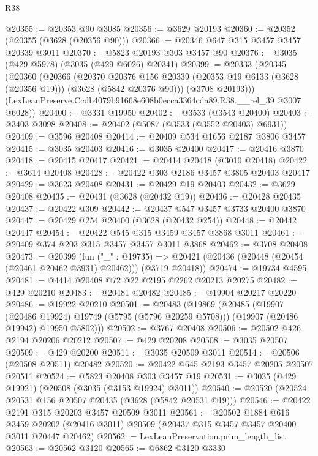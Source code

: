 \begin{lexlean}{R38}
\begin{coremodule}
@20355 := @20353 @90 @3085
@20356 := @3629 @20193
@20360 := @20352 (@20355 (@3628 (@20356 @90)))
@20366 := @20346 @647 @315 @3457 @3457 @20339 @3011
@20370 := @5823 @20193 @303 @3457 @90
@20376 := @3035 (@429 @5978) (@3035 (@429 @6026) @20341)
@20399 := @20333
    (@20345
      (@20360
        (@20366
          (@20370
            @20376
            @156
            @20339
            (@20353 @19 @6133 (@3628 (@20356 @19)))
            (@3628 (@5842 @20376 @90)))
          (@3708 @20193)))
      (LexLeanPreserve.Ccdb4079b91668e608b0ecca3364cda89.R38.__rel_39 @3007 @6028))
@20400 := @3331 @19950
@20402 := @3533 (@3543 @20400)
@20403 := @3403 @3098
@20408 := @20402 (@5087 (@3533 (@3552 @20403) @6931))
@20409 := @3596 @20408
@20414 := @20409 @534 @1656 @2187 @3806 @3457
@20415 := @3035 @20403
@20416 := @3035 @20400
@20417 := @20416 @3870
@20418 := @20415 @20417
@20421 := @20414 @20418 (@3010 @20418)
@20422 := @3614 @20408
@20428 := @20422 @303 @2186 @3457 @3805 @20403 @20417
@20429 := @3623 @20408
@20431 := @20429 @19 @20403
@20432 := @3629 @20408
@20435 := @20431 (@3628 (@20432 @19))
@20436 := @20428 @20435
@20437 := @20422 @309
@20442 := @20437 @547 @3457 @3733 @20400 @3870
@20447 := @20429 @254 @20400 (@3628 (@20432 @254))
@20448 := @20442 @20447
@20454 := @20422 @545 @315 @3459 @3457 @3868 @3011
@20461 := @20409 @374 @203 @315 @3457 @3457 @3011 @3868
@20462 := @3708 @20408
@20473 := @20399
    (fun ("_" : @19735) =>
    @20421 (@20436 (@20448 (@20454 (@20461 @20462 @3931) @20462))) (@3719 @20418))
@20474 := @19734 @4595
@20481 := @4414 @20408 @72 @22 @2195 @2262 @20213 @20275
@20482 := @429 @20210
@20483 := @20481 @20482
@20485 := @19904 @20217 @20220
@20486 := @19922 @20210
@20501 := @20483
    (@19869
      (@20485
        (@19907 (@20486 @19924) @19749 (@5795 (@5796 @20259 @5708)))
        (@19907 (@20486 @19942) @19950 @5802)))
@20502 := @3767 @20408
@20506 := @20502 @426 @2194 @20206 @20212
@20507 := @429 @20208
@20508 := @3035 @20507
@20509 := @429 @20200
@20511 := @3035 @20509 @3011
@20514 := @20506 (@20508 @20511) @20482
@20520 := @20422 @645 @2193 @3457 @20205 @20507 @20511
@20524 := @5823 @20408 @303 @3457 @19
@20531 := @3035 (@429 @19921) (@20508 (@3035 (@3153 @19924) @3011))
@20540 := @20520 (@20524 @20531 @156 @20507 @20435 (@3628 (@5842 @20531 @19)))
@20546 := @20422 @2191 @315 @20203 @3457 @20509 @3011
@20561 := @20502
    @1884
    @616
    @3459
    @20202
    (@20416 @3011)
    @20509
    (@20437 @315 @3457 @3457 @20400 @3011 @20447 @20462)
@20562 := LexLeanPreservation.prim_length_list
@20563 := @20562 @3120
@20565 := @6862 @3120 @3330

\end{coremodule}
\end{lexlean}
